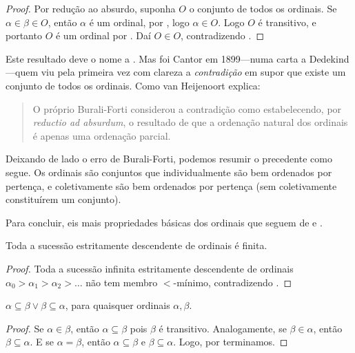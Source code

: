 \documentclass[../../../include/open-logic-section]{subfiles}
\begin{document}
\begin{proof}
Por redução ao absurdo, suponha $O$ o conjunto de todos os ordinais. Se $\alpha \in
\beta \in O$, então $\alpha$ é um ordinal, por , logo
$\alpha \in O$. Logo $O$ é transitivo, e portanto $O$ é um ordinal por
. Daí $O \in O$, contradizendo
. 
\end{proof}
\noindent
Este resultado deve o nome a \citeauthor{Burali-Forti1897}. Mas foi Cantor em 1899---numa carta a Dedekind---quem viu
pela primeira vez com clareza a \emph{contradição} em supor que existe um conjunto de
todos os ordinais. Como van
Heijenoort explica:
\begin{quote}
  O próprio Burali-Forti considerou a contradição como estabelecendo,
  por \emph{reductio ad absurdum}, o resultado de que a ordenação natural
  dos ordinais é apenas uma ordenação parcial.
  \citep[p.~105]{Heijenoort1967}
\end{quote}
Deixando de lado o erro de Burali-Forti, podemos resumir o precedente como segue. Os ordinais são conjuntos que individualmente são bem ordenados por
pertença, e coletivamente são bem ordenados por pertença (sem coletivamente constituírem um conjunto). 

Para concluir, eis mais propriedades básicas dos
ordinais que seguem de  e
. 

\begin{prop}
Toda a sucessão estritamente descendente de ordinais é finita.
\end{prop}

\begin{proof}
Toda a sucessão infinita estritamente descendente de ordinais $\alpha_0 > \alpha_1 > \alpha_2 > \ldots$ não tem membro
$<$-mínimo, contradizendo .
\end{proof}

\begin{prop}
$\alpha \subseteq \beta \lor \beta \subseteq \alpha$, para quaisquer ordinais
$\alpha, \beta$.
\end{prop}

\begin{proof}
Se $\alpha \in \beta$, então $\alpha \subseteq \beta$ pois $\beta$ é
transitivo. Analogamente, se $\beta \in \alpha$, então $\beta \subseteq
\alpha$. E se $\alpha = \beta$, então $\alpha \subseteq \beta$ e
$\beta \subseteq \alpha$. Logo, por  terminamos.
\end{proof}
\end{document}

